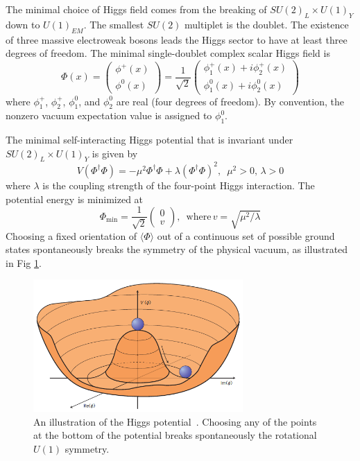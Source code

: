 The minimal choice of Higgs field comes from the breaking of $SU(2)_L \times U(1)_Y$ down to $U(1)_{EM}$. The smallest $SU(2)$ multiplet is the doublet. The existence of three massive electroweak bosons leads the Higgs sector to have at least three degrees of freedom. The minimal single-doublet complex scalar Higgs field is
\begin{equation}
    \Phi(x) = \begin{pmatrix} \phi^+(x) \\ \phi^0(x) \end{pmatrix} 
    = \frac{1}{\sqrt{2}} \begin{pmatrix} \phi_1^+(x) + i\phi_2^+(x) \\ \phi_1^0(x) + i\phi_2^0 (x) \end{pmatrix}
\end{equation}
where $\phi_1^+$, $\phi_2^+$, $\phi_1^0$, and $\phi_2^0$ are real (four degrees of freedom). By convention, the nonzero vacuum expectation value is assigned to $\phi_1^0$.

The minimal self-interacting Higgs potential that is invariant under $SU(2)_L \times U(1)_Y$ is given by
\begin{equation}
    V(\Phi^\dagger \Phi) = -\mu^2 \Phi^\dagger \Phi + \lambda (\Phi^\dagger \Phi)^2, \,\,\, \mu^2 > 0, \, \lambda > 0
\end{equation}
where $\lambda$ is the coupling strength of the four-point Higgs interaction. 
The potential energy is minimized at 
\begin{equation}
    \Phi_{\text{min}} = \frac{1}{\sqrt{2}} \begin{pmatrix} 0 \\ v \end{pmatrix}, \,\,\,\text{where} \, v = \sqrt{\mu^2 / \lambda}
\end{equation}
Choosing a fixed orientation of $\langle \Phi \rangle$ out of a continuous set of possible ground states spontaneously breaks the symmetry of the physical vacuum, as illustrated in Fig \ref{fig:higgs-potential}.

\begin{figure}[ht]
    \centering
    \includegraphics[width=8cm]{figures/ch-1-introduction/higgs-potential.png}
    \caption[An illustration of the Higgs potential.]{An illustration of the Higgs potential~\cite{Ellis:2013jnq}. Choosing any of the points at the bottom of the potential breaks spontaneously the rotational $U(1)$ symmetry.}
    \label{fig:higgs-potential}
\end{figure}

